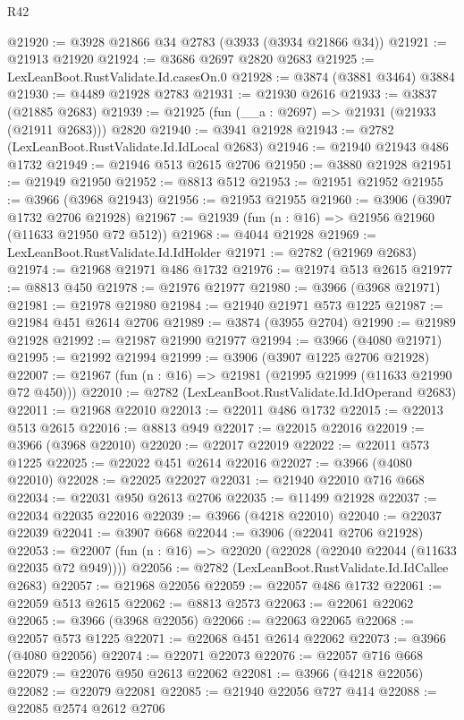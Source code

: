 \begin{lexlean}{R42}
\begin{coremodule}
@21920 := @3928 @21866 @34 @2783 (@3933 (@3934 @21866 @34))
@21921 := @21913 @21920
@21924 := @3686 @2697 @2820 @2683
@21925 := LexLeanBoot.RustValidate.Id.casesOn.{0}
@21928 := @3874 (@3881 @3464) @3884
@21930 := @4489 @21928 @2783
@21931 := @21930 @2616
@21933 := @3837 (@21885 @2683)
@21939 := @21925 (fun (__a : @2697) => @21931 (@21933 (@21911 @2683))) @2820
@21940 := @3941 @21928
@21943 := @2782 (LexLeanBoot.RustValidate.Id.IdLocal @2683)
@21946 := @21940 @21943 @486 @1732
@21949 := @21946 @513 @2615 @2706
@21950 := @3880 @21928
@21951 := @21949 @21950
@21952 := @8813 @512
@21953 := @21951 @21952
@21955 := @3966 (@3968 @21943)
@21956 := @21953 @21955
@21960 := @3906 (@3907 @1732 @2706 @21928)
@21967 := @21939 (fun (n : @16) => @21956 @21960 (@11633 @21950 @72 @512))
@21968 := @4044 @21928
@21969 := LexLeanBoot.RustValidate.Id.IdHolder
@21971 := @2782 (@21969 @2683)
@21974 := @21968 @21971 @486 @1732
@21976 := @21974 @513 @2615
@21977 := @8813 @450
@21978 := @21976 @21977
@21980 := @3966 (@3968 @21971)
@21981 := @21978 @21980
@21984 := @21940 @21971 @573 @1225
@21987 := @21984 @451 @2614 @2706
@21989 := @3874 (@3955 @2704)
@21990 := @21989 @21928
@21992 := @21987 @21990 @21977
@21994 := @3966 (@4080 @21971)
@21995 := @21992 @21994
@21999 := @3906 (@3907 @1225 @2706 @21928)
@22007 := @21967 (fun (n : @16) => @21981 (@21995 @21999 (@11633 @21990 @72 @450)))
@22010 := @2782 (LexLeanBoot.RustValidate.Id.IdOperand @2683)
@22011 := @21968 @22010
@22013 := @22011 @486 @1732
@22015 := @22013 @513 @2615
@22016 := @8813 @949
@22017 := @22015 @22016
@22019 := @3966 (@3968 @22010)
@22020 := @22017 @22019
@22022 := @22011 @573 @1225
@22025 := @22022 @451 @2614 @22016
@22027 := @3966 (@4080 @22010)
@22028 := @22025 @22027
@22031 := @21940 @22010 @716 @668
@22034 := @22031 @950 @2613 @2706
@22035 := @11499 @21928
@22037 := @22034 @22035 @22016
@22039 := @3966 (@4218 @22010)
@22040 := @22037 @22039
@22041 := @3907 @668
@22044 := @3906 (@22041 @2706 @21928)
@22053 := @22007 (fun (n : @16) => @22020 (@22028 (@22040 @22044 (@11633 @22035 @72 @949))))
@22056 := @2782 (LexLeanBoot.RustValidate.Id.IdCallee @2683)
@22057 := @21968 @22056
@22059 := @22057 @486 @1732
@22061 := @22059 @513 @2615
@22062 := @8813 @2573
@22063 := @22061 @22062
@22065 := @3966 (@3968 @22056)
@22066 := @22063 @22065
@22068 := @22057 @573 @1225
@22071 := @22068 @451 @2614 @22062
@22073 := @3966 (@4080 @22056)
@22074 := @22071 @22073
@22076 := @22057 @716 @668
@22079 := @22076 @950 @2613 @22062
@22081 := @3966 (@4218 @22056)
@22082 := @22079 @22081
@22085 := @21940 @22056 @727 @414
@22088 := @22085 @2574 @2612 @2706

\end{coremodule}
\end{lexlean}
